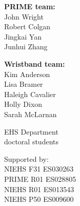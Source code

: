 \documentclass{beamer}
\begin{document}
{\begin{columns}

\begin{flushright}
\scriptsize
{\color{matbluedark} \textbf{PRIME team:}} \\
            John Wright \\
            Robert Colgan \\
            Jingkai Yan \\
            Junhui Zhang \\

\vspace{4mm}

{\color{matbluedark} \textbf{Wristband team:}} \\
Kim Anderson \\
Lisa Bramer \\
Haleigh Cavalier \\
Holly Dixon \\
Sarah McLarnan \\

\vspace{4mm}

EHS Department \\ doctoral students

\vspace{4mm}

{\tiny\color{gray}Supported by: \\
NIEHS F31 ES030263 \\
PRIME R01 ES028805 \\
NIEHS R01 ES013543 \\
NIEHS P50 ES009600 \\
}

\end{flushright}

\end{columns}
}
\end{document}
